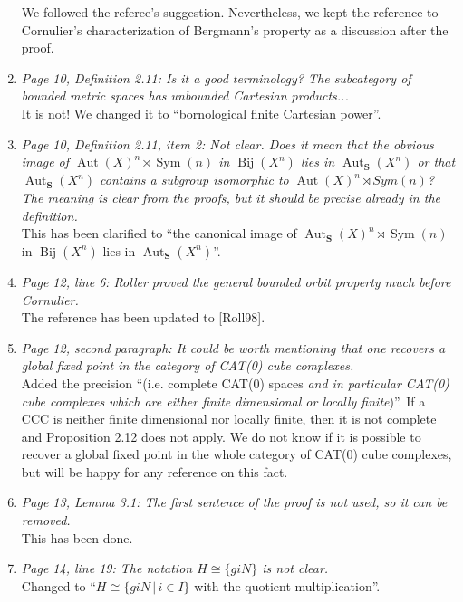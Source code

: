 \documentclass[english,a4paper]{article}
\DeclareMathOperator\Aut{Aut}
\DeclareMathOperator\Sym{Sym}
\DeclareMathOperator\Bij{Bij}
\newcommand*\setst[2]{\{#1\,|\,#2\}}
\begin{document}
\begin{enumerate}
We followed the referee's suggestion. Nevertheless, we kept the reference to Cornulier's characterization of Bergmann's property as a discussion after the proof.



%
\item\textit{Page 10, Definition 2.11: Is it a good terminology? The subcategory of bounded metric spaces has unbounded Cartesian products...}\\
It is not! We changed it to ``bornological finite Cartesian power''.
%
\item\textit{Page 10, Definition 2.11, item 2: Not clear. Does it mean that the obvious image of $\Aut(X)^n\rtimes\Sym(n)$ in $\Bij(X^n)$ lies in $\Aut_{\mathbf S}(X^n)$ or that $\Aut_{\mathbf S}(X^n)$ contains a subgroup isomorphic to $\Aut(X)^n\rtimes Sym(n)$? The meaning is clear from the proofs, but it should be precise already in the definition.}\\
This has been clarified to ``the canonical image of $\Aut_{\mathbf S}(X)^n\rtimes \Sym(n)$ in $\Bij(X^n)$ lies in $\Aut_{\mathbf S}(X^n)$''.
%
\item\textit{Page 12, line 6: Roller proved the general bounded orbit property much before Cornulier.}\\
The reference has been updated to [Roll98].
%
\item\textit{Page 12, second paragraph: It could be worth mentioning that one recovers a global fixed point in the category of CAT(0) cube complexes.
}\\
Added the precision ``(i.e. complete CAT(0) spaces \emph{and in particular CAT(0) cube complexes which are either finite dimensional or locally finite})''.
If a CCC is neither finite dimensional nor locally finite, then it is not complete and Proposition 2.12 does not apply.
We do not know if it is possible to recover a global fixed point in the whole category of CAT(0) cube complexes, but will be happy for any reference on this fact.
%
\item\textit{Page 13, Lemma 3.1: The first sentence of the proof is not used, so it can be removed.}\\
This has been done.
%
\item\textit{Page 14, line 19: The notation $H\cong\{giN\}$ is not clear.}\\
Changed to ``$H\cong\setst{giN}{i\in I}$ with the quotient multiplication''.
%

\end{enumerate}
\end{document}
